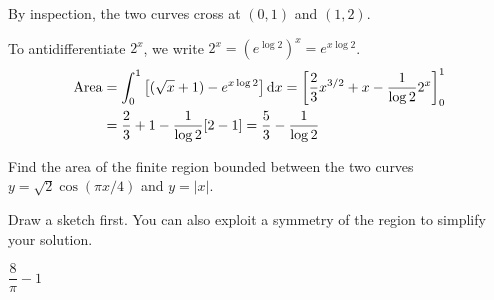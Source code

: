 \begin{solution}
By inspection, the two curves cross at $(0,1)$ and $(1,2)$.


\begin{center}
\end{center}


To antidifferentiate $2^x$, we write $2^x={(e^{\log 2})}^x=e^{x\log 2}$.
\begin{align*}
\text{Area} &= \int_0^1\big[(\sqrt{x}+1)-e^{x\log 2}\big]\,\mathrm{d}x
=\left[\frac{2}{3}x^{3/2}+x-\frac{1}{\log 2} 2^x\right]_0^1 \\
&=\frac{2}{3}+1-\frac{1}{\log 2}[2-1]
=\frac{5}{3}-\frac{1}{\log 2}
\end{align*}
\end{solution}


\begin{question}[2014A]
Find the area of the finite region bounded between the two curves
$y = \sqrt{2} \cos(\pi x/4)$ and $y = |x|$.
\end{question}

\begin{hint}
Draw a sketch first. You can also exploit a symmetry of the region
to simplify your solution.
\end{hint}

\begin{answer}
$\dfrac{8}{\pi}-1$
\end{answer}

